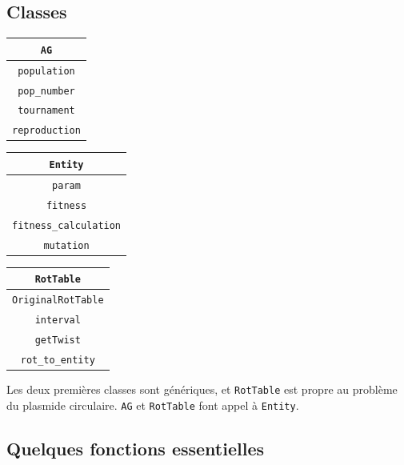 \documentclass[graphics]{beamer}
\begin{document}
\subsection{Classes} 

\begin{frame}

\begin{tabular}{| c |}
	\hline
	\texttt{AG} \\ \hline \hline
	\texttt{population} \\
	\texttt{pop_number}  \\ \hline
	\texttt{tournament} \\
	\texttt{reproduction} \\ \hline
\end{tabular}
\begin{tabular}{ | c | }
	\hline
	\texttt{Entity} \\ \hline \hline
	\texttt{param}  \\  
	\texttt{fitness}  \\ \hline
	\texttt{fitness_calculation} \\
	\texttt{mutation}  \\ \hline
\end{tabular}
\begin{tabular}{ | c | }
	\hline
	\texttt{RotTable} \\ \hline \hline
	\texttt{OriginalRotTable}  \\ 
	\texttt{interval}  \\ \hline
	\texttt{getTwist}  \\ 
	\texttt{rot_to_entity} \\ \hline
\end{tabular}
\vfill
Les deux premières classes sont génériques, et \texttt{RotTable} est propre au problème du plasmide circulaire. \texttt{AG} et \texttt{RotTable} font appel à \texttt{Entity}.
\end{frame}
\subsection{Quelques fonctions essentielles}
\end{document}
